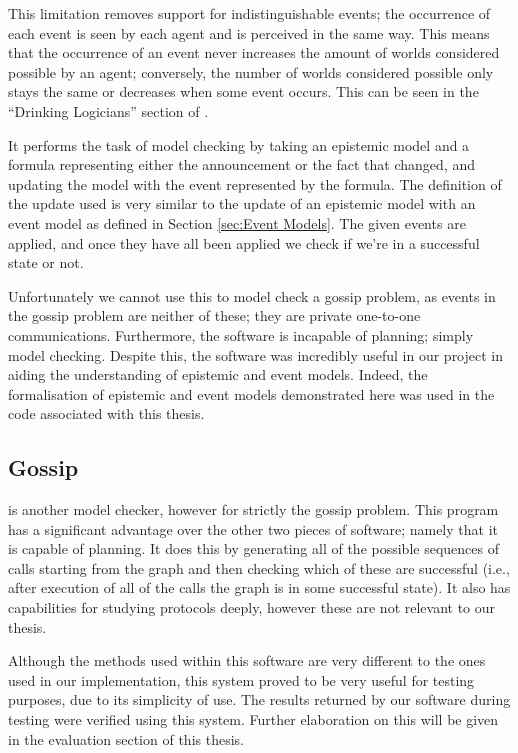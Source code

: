 \documentclass[10pt, a4paper]{report}
\begin{document}
This limitation removes support for indistinguishable events; the occurrence of
each event is seen by each agent and is perceived in the same way. This means
that the occurrence of an event never increases the amount of worlds considered
possible by an agent; conversely, the number of worlds considered possible only
stays the same or decreases when some event occurs. This can be seen in the
``Drinking Logicians'' section of \cite{DEMO-S5}.

It performs the task of model checking by taking an epistemic model and a
formula representing either the announcement or the fact that changed, and
updating the model with the event represented by the formula. The definition of
the update used is very similar to the update of an epistemic model with an
event model as defined in Section \ref{sec:Event Models}. The given events are
applied, and once they have all been applied we check if we're in a successful
state or not.

Unfortunately we cannot use this to model check a gossip problem, as events in
the gossip problem are neither of these; they are private one-to-one
communications. Furthermore, the software is incapable of planning; simply model
checking. Despite this, the software was incredibly useful in our project in
aiding the understanding of epistemic and event models. Indeed, the
formalisation of epistemic and event models demonstrated here was used in the
code associated with this thesis.

\subsection{Gossip}

\cite{GithubGossip} is another model checker, however for strictly the gossip
problem. This program has a significant advantage over the other two pieces of
software; namely that it is capable of planning. It does this by generating all
of the possible sequences of calls starting from the graph and then checking
which of these are successful (i.e., after execution of all of the calls the
graph is in some successful state). It also has capabilities for studying
protocols deeply, however these are not relevant to our thesis.

Although the methods used within this software are very different to the ones
used in our implementation, this system proved to be very useful for testing
purposes, due to its simplicity of use. The results returned by our software
during testing were verified using this system. Further elaboration on this will
be given in the evaluation section of this thesis.
\end{document}
